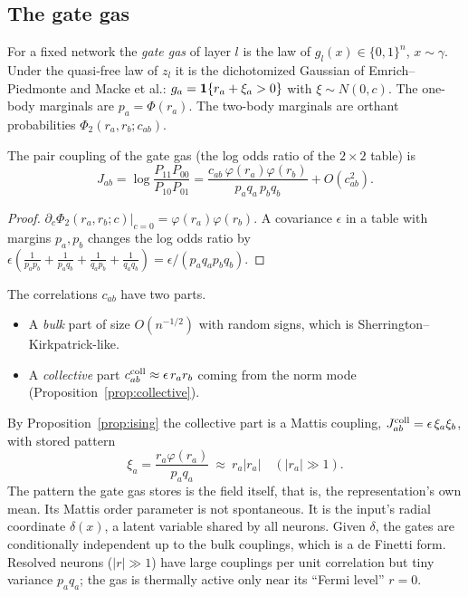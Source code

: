\label{sec:gates}
\subsection{The gate gas}
For a fixed network the \emph{gate gas} of layer $l$ is the law of $g_l(x)\in\{0,1\}^n$, $x\sim\gamma$. Under the quasi-free law of $z_l$ it is
the dichotomized Gaussian of Emrich--Piedmonte and Macke et al.: $g_a=\mathbf 1\{r_a+\xi_a>0\}$ with $\xi\sim N(0,c)$. The one-body marginals are
$p_a=\Phi(r_a)$. The two-body marginals are orthant probabilities $\Phi_2(r_a,r_b;c_{ab})$.

\begin{proposition}\label{prop:ising}
The pair coupling of the gate gas (the log odds ratio of the $2\times2$ table) is
\[
J_{ab}=\log\frac{P_{11}P_{00}}{P_{10}P_{01}}=\frac{c_{ab}\,\varphi(r_a)\varphi(r_b)}{p_aq_a\,p_bq_b}+O(c_{ab}^2).
\]
\end{proposition}
\begin{proof}
$\partial_c\Phi_2(r_a,r_b;c)|_{c=0}=\varphi(r_a)\varphi(r_b)$. A covariance $\epsilon$ in a table with margins $p_a,p_b$ changes the log odds ratio by
$\epsilon(\frac1{p_ap_b}+\frac1{p_aq_b}+\frac1{q_ap_b}+\frac1{q_aq_b})=\epsilon/(p_aq_ap_bq_b)$.
\end{proof}
The correlations $c_{ab}$ have two parts.
\begin{itemize}[leftmargin=*]
\item A \emph{bulk} part of size $O(n^{-1/2})$ with random signs, which is Sherrington--Kirkpatrick-like.
\item A \emph{collective} part $c^{\rm coll}_{ab}\approx\epsilon\,r_ar_b$ coming from the norm mode (Proposition~\ref{prop:collective}).
\end{itemize}
By Proposition~\ref{prop:ising} the collective part is a Mattis coupling, $J^{\rm coll}_{ab}=\epsilon\,\xi_a\xi_b$, with stored pattern
\[
\xi_a=\frac{r_a\varphi(r_a)}{p_aq_a}\ \approx\ r_a|r_a|\quad(|r_a|\gg1).
\]
The pattern the gate gas stores is the field itself, that is, the representation's own mean. Its Mattis order parameter is not
spontaneous. It is the input's radial coordinate $\delta(x)$, a latent variable shared by all neurons. Given $\delta$, the gates are
conditionally independent up to the bulk couplings, which is a de Finetti form. Resolved neurons ($|r|\gg1$) have large couplings
per unit correlation but tiny variance $p_aq_a$; the gas is thermally active only near its ``Fermi level'' $r=0$.

